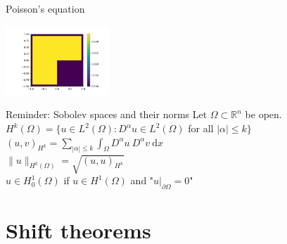 \documentclass{beamer}
\begin{document}
\begin{frame}{Poisson's equation}
\begin{minipage}[b]{0.3\textwidth}
\end{minipage}
\begin{minipage}[b]{0.3\textwidth}
	\includegraphics[height=2.6cm,trim=0 0 3.4cm 0,clip=true]{sol1.png}
\end{minipage}

\end{frame}


\begin{frame}{Reminder: Sobolev spaces and their norms}
Let $\Omega \subset \mathbb{R}^n$ be open.\\[0.8cm]
\pause
$\displaystyle H^k(\Omega) = \{u \in L^2(\Omega): D^\alpha u \in L^2(\Omega)$ for all $|\alpha| \leq k\}$\\[0.5cm]
\pause
$\displaystyle (u,v)_{H^k} = \sum_{|\alpha| \leq k} \int_\Omega D^\alpha u \ D^\alpha v \ \text{d}x$\\[0.5cm]
\pause
$\displaystyle \|u\|_{H^k(\Omega)} = \sqrt{(u,u)_{H^k}}$\\[0.5cm]
\pause
$\displaystyle u \in H_0^1(\Omega)$ if $u \in H^1(\Omega)$ and "$u |_ { \partial \Omega} = 0$"
\end{frame}


\section{Shift theorems}
\end{document}
